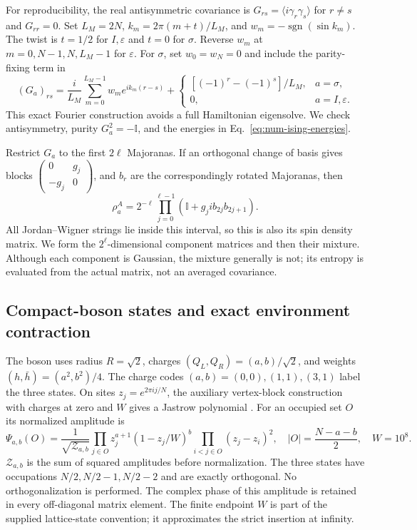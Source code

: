 For reproducibility, the real antisymmetric covariance is
$G_{rs}=\langle i\gamma_r\gamma_s\rangle$ for $r\ne s$ and
$G_{rr}=0$. Set $L_M=2N$, $k_m=2\pi(m+t)/L_M$, and
$w_m=-\operatorname{sgn}(\sin k_m)$. The twist is $t=1/2$
for $I,\varepsilon$ and $t=0$ for $\sigma$. Reverse $w_m$
at $m=0,N-1,N,L_M-1$ for $\varepsilon$. For $\sigma$, set
$w_0=w_N=0$ and include the parity-fixing term in
\begin{equation}
 (G_a)_{rs}=\frac{i}{L_M}\sum_{m=0}^{L_M-1}w_m e^{ik_m(r-s)}
 +\begin{cases}[(-1)^r-(-1)^s]/L_M,&a=\sigma,\\0,&a=I,\varepsilon.
 \end{cases}
 \label{eq:num-covariance}
\end{equation}
This exact Fourier construction avoids a full Hamiltonian
eigensolve. We check antisymmetry, purity $G_a^2=-\mathbb I$,
and the energies in Eq.~\eqref{eq:num-ising-energies}.

Restrict $G_a$ to the first $2\ell$ Majoranas. If an orthogonal
change of basis gives blocks
$\left(\begin{smallmatrix}0&g_j\\-g_j&0\end{smallmatrix}\right)$,
and $b_r$ are the correspondingly rotated Majoranas, then
\begin{equation}
 \rho_a^A=2^{-\ell}\prod_{j=0}^{\ell-1}
       (\mathbb I+g_j i b_{2j}b_{2j+1}).
 \label{eq:num-ising-rdm}
\end{equation}
All Jordan--Wigner strings lie inside this interval, so this is
also its spin density matrix. We form the $2^\ell$-dimensional
component matrices and then their mixture. Although each
component is Gaussian, the mixture generally is not; its
entropy is evaluated from the actual matrix, not an averaged
covariance.

\subsection{Compact-boson states and exact environment contraction}
\label{app:num-boson}
The boson uses radius $R=\sqrt2$, charges
$(Q_L,Q_R)=(a,b)/\sqrt2$, and weights
$(h,\bar h)=(a^2,b^2)/4$. The charge codes
$(a,b)=(0,0),(1,1),(3,1)$ label the three states. On sites
$z_j=e^{2\pi i j/N}$, the auxiliary vertex-block construction
with charges at zero and $W$ gives a Jastrow polynomial
\cite{numHerwerth}. For an occupied set $O$ its normalized
amplitude is
\begin{equation}
 \Psi_{a,b}(O)=\frac{1}{\sqrt{\mathcal Z_{a,b}}}
 \prod_{j\in O}z_j^{a+1}(1-z_j/W)^b
 \prod_{i<j\in O}(z_j-z_i)^2,
 \quad |O|=\frac{N-a-b}{2},\quad W=10^8.
 \label{eq:num-boson-wavefunction}
\end{equation}
$\mathcal Z_{a,b}$ is the sum of squared amplitudes before
normalization. The three states have occupations $N/2,N/2-1,N/2-2$
and are exactly orthogonal. No orthogonalization is performed.
The complex phase of this amplitude is retained in every
off-diagonal matrix element. The finite endpoint $W$ is part
of the supplied lattice-state convention; it approximates the
strict insertion at infinity.

